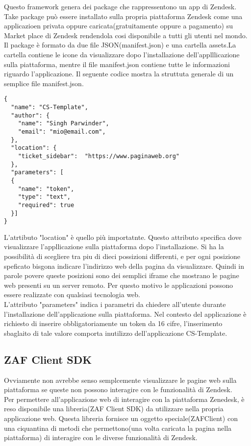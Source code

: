 Questo framework genera dei package che rappressentono un app di Zendesk.
Take package può essere installato sulla propria piattaforma Zendesk come una applicazioen privata oppure caricata(gratuitamente oppure a pagamento) su Market place di Zendesk rendendola cosi disponibile a tutti gli utenti nel mondo. Il package è formato da due file JSON(manifest.json) e una cartella assets.La cartella contiene le icone da visualizzare dopo l'installazione dell'applllicazione sulla piattaforma, mentre il file manifest.json contiene tutte le informazioni riguardo l'applicazione. Il seguente codice mostra la struttuta generale di un semplice file manifest.json. \\
\begin{lstlisting}
{
  "name": "CS-Template",
  "author": {
	"name": "Singh Parwinder",
	"email": "mio@email.com",
  },
  "location": {
	"ticket_sidebar":  "https://www.paginaweb.org"
  },	
  "parameters": [
  {
    "name": "token",
	"type": "text",
	"required": true
  }]
}
\end{lstlisting}
L'atrtibuto "location" è quello più importatnte. Questo attributo specifica dove visualizzare l'appllicazione sulla piattaforma dopo l'installazione. Si ha la possibilità di scegliere tra piu di dieci possizioni differenti, e per ogni posizione speficato bisgona indicare l'indirizzo web della pagina da visualizzare. Quindi in parole povere queste posizioni sono dei semplici iframe che mostrano le pagine web presenti su un server remoto.   Per questo motivo le applicazioni possono essere realizzate con qualsiasi tecnologia web. 
\\

L'attributo "parameters" indica i parametri da chiedere all'utente durante l'installazione dell'applicazione sulla piattaforma. Nel contesto del applicazione è richiesto di inserire obbligatoriamente un token da 16 cifre, l'inserimento sbaglaito di tale valore comporta inutilizzo dell'applicazione CS-Template. 

\subsection{ZAF Client SDK}
Ovviamente non avrebbe senso semplcemente visualizzare le pagine web sulla piattaforma se queste non possono interagire con le funzionalità di Zendesk. 
\\

Per permettere all'applicazione web di interagire con la piattaforma Zenedesk, è reso disponibile una libreria(ZAF Client SDK) da utilizzare nella propria applicazione web. Questa libreria fornisce un oggetto speciale(ZAFClient) con una ciquantina di metodi che permettono(una volta caricata la pagina nella piattaforma) di interagire con le diverse funzionalità di Zendesk.
\\
 
